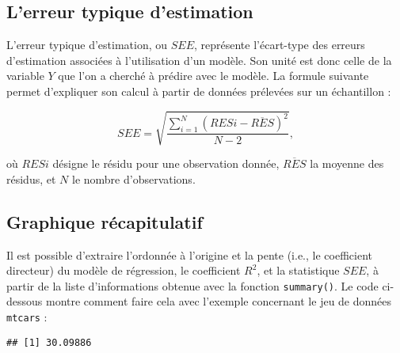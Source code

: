 \documentclass[
]{book}
\newenvironment{Shaded}{\begin{snugshade}}{\end{snugshade}}
\newcommand{\CommentTok}[1]{\textcolor[rgb]{0.56,0.35,0.01}{\textit{#1}}}
\newcommand{\DecValTok}[1]{\textcolor[rgb]{0.00,0.00,0.81}{#1}}
\newcommand{\FunctionTok}[1]{\textcolor[rgb]{0.00,0.00,0.00}{#1}}
\newcommand{\NormalTok}[1]{#1}
\newcommand{\OtherTok}[1]{\textcolor[rgb]{0.56,0.35,0.01}{#1}}
\newcommand{\SpecialCharTok}[1]{\textcolor[rgb]{0.00,0.00,0.00}{#1}}
\begin{document}
\hypertarget{lerreur-typique-destimation}{%
\subsection{L'erreur typique d'estimation}\label{lerreur-typique-destimation}}

L'erreur typique d'estimation, ou \(SEE\), représente l'écart-type des erreurs d'estimation associées à l'utilisation d'un modèle. Son unité est donc celle de la variable \(Y\) que l'on a cherché à prédire avec le modèle. La formule suivante permet d'expliquer son calcul à partir de données prélevées sur un échantillon :

\[ SEE = \sqrt{\frac{\sum_{i=1}^{N}(RES{i} - \overline{RES})^2}{N-2}}, \]

où \(RES{i}\) désigne le résidu pour une observation donnée, \(\overline{RES}\) la moyenne des résidus, et \(N\) le nombre d'observations.

\hypertarget{graphique-ruxe9capitulatif}{%
\subsection{Graphique récapitulatif}\label{graphique-ruxe9capitulatif}}

Il est possible d'extraire l'ordonnée à l'origine et la pente (i.e., le coefficient directeur) du modèle de régression, le coefficient \(R^2\), et la statistique \(SEE\), à partir de la liste d'informations obtenue avec la fonction \texttt{summary()}. Le code ci-dessous montre comment faire cela avec l'exemple concernant le jeu de données \texttt{mtcars} :

\begin{Shaded}
\end{Shaded}

\begin{verbatim}
## [1] 30.09886
\end{verbatim}

\begin{Shaded}
\end{Shaded}
\end{document}
